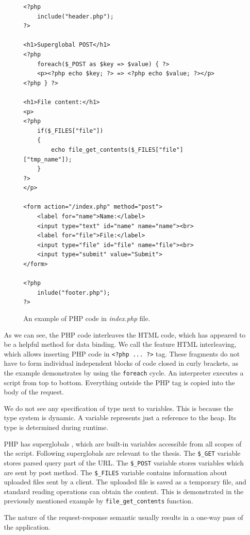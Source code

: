 \begin{figure}
\begin{lstlisting}
<?php
    include("header.php");
?>

<h1>Superglobal POST</h1>
<?php
    foreach($_POST as $key => $value) { ?>
    <p><?php echo $key; ?> => <?php echo $value; ?></p>
<?php } ?>

<h1>File content:</h1>
<p>
<?php 
    if($_FILES["file"])
    {
        echo file_get_contents($_FILES["file"]["tmp_name"]);
    }	
?>
</p>

<form action="/index.php" method="post">
    <label for="name">Name:</label>
    <input type="text" id="name" name="name"><br>
    <label for="file">File:</label>
    <input type="file" id="file" name="file"><br>
    <input type="submit" value="Submit">
</form>

<?php
    inlude("footer.php");
?>
\end{lstlisting}
\caption{An example of PHP code in \textit{index.php} file.}
\label{img01:php}
\end{figure}
\par
As we can see, the PHP code interleaves the HTML code, which has appeared to be a helpful method for data binding.
We call the feature HTML interleaving, which allows inserting PHP code in \texttt{<?php ... ?>} tag.
These fragments do not have to form individual independent blocks of code closed in curly brackets, as the example demonstrates by using the \texttt{foreach} cycle.
An interpreter executes a script from top to bottom. Everything outside the PHP tag is copied into the body of the request.
\par
We do not see any specification of type next to variables.
This is because the type system is dynamic.
A variable represents just a reference to the heap.
Its type is determined during runtime. 
\par
PHP has superglobals \cite{online:phpManual}, which are built-in variables accessible from all scopes of the script.
Following superglobals are relevant to the thesis.
The \texttt{\$\_GET} variable stores parsed query part of the URL.
The \texttt{\$\_POST} variable stores variables which are sent by post method.
The \texttt{\$\_FILES} variable contains information about uploaded files sent by a client.
The uploaded file is saved as a temporary file, and standard reading operations can obtain the content.
This is demonstrated in the previously mentioned example by \texttt{file\_get\_contents} function.
\par
The nature of the request-response semantic usually results in a one-way pass of the application.
